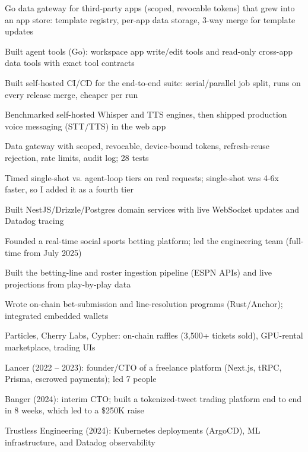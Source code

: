 \documentclass[print]{jack-resume}
\begin{document}
\begin{tightemize}
    \item Go data gateway for third-party apps (scoped, revocable tokens) that grew into an app store: template registry, per-app data storage, 3-way merge for template updates
    \item Built agent tools (Go): workspace app write/edit tools and read-only cross-app data tools with exact tool contracts
    \item Built self-hosted CI/CD for the end-to-end suite: serial/parallel job split, runs on every release merge, cheaper per run
    \item Benchmarked self-hosted Whisper and TTS engines, then shipped production voice messaging (STT/TTS) in the web app
    \item Data gateway with scoped, revocable, device-bound tokens, refresh-reuse rejection, rate limits, audit log; 28 tests
    \item Timed single-shot vs. agent-loop tiers on real requests; single-shot was 4-6x faster, so I added it as a fourth tier
\end{tightemize}
\sectionsep

\begin{tightemize}
    \item Built NestJS/Drizzle/Postgres domain services with live WebSocket updates and Datadog tracing
    \item Founded a real-time social sports betting platform; led the engineering team (full-time from July 2025)
    \item Built the betting-line and roster ingestion pipeline (ESPN APIs) and live projections from play-by-play data
    \item Wrote on-chain bet-submission and line-resolution programs (Rust/Anchor); integrated embedded wallets
\end{tightemize}
\sectionsep

\begin{tightemize}
    \item Particles, Cherry Labs, Cypher: on-chain raffles (3,500+ tickets sold), GPU-rental marketplace, trading UIs
    \item Lancer (2022 – 2023): founder/CTO of a freelance platform (Next.js, tRPC, Prisma, escrowed payments); led 7 people
    \item Banger (2024): interim CTO; built a tokenized-tweet trading platform end to end in 8 weeks, which led to a \$250K raise
    \item Trustless Engineering (2024): Kubernetes deployments (ArgoCD), ML infrastructure, and Datadog observability
\end{tightemize}
\sectionsep
\end{document}
